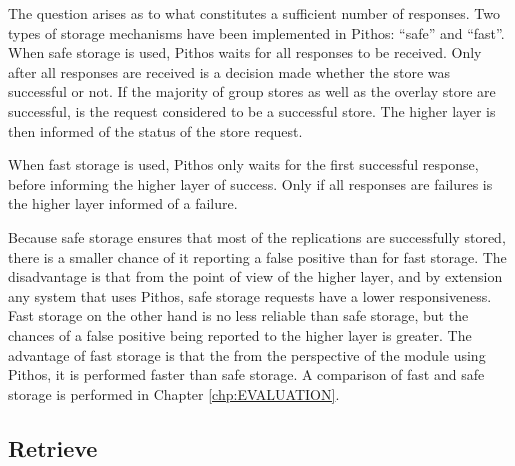 The question arises as to what constitutes a sufficient number of responses. Two types of storage mechanisms have been implemented in Pithos: ``safe'' and ``fast''. When safe storage is used, Pithos waits for all responses to be received. Only after all responses are received is a decision made whether the store was successful or not. If the majority of group stores as well as the overlay store are successful, is the request considered to be a successful store. The higher layer is then informed of the status of the store request.

When fast storage is used, Pithos only waits for the first successful response, before informing the higher layer of success. Only if all responses are failures is the higher layer informed of a failure.

Because safe storage ensures that most of the replications are successfully stored, there is a smaller chance of it reporting a false positive than for fast storage. The disadvantage is that from the point of view of the higher layer, and by extension any system that uses Pithos, safe storage requests have a lower responsiveness. Fast storage on the other hand is no less reliable than safe storage, but the chances of a false positive being reported to the higher layer is greater. The advantage of fast storage is that the from the perspective of the module using Pithos, it is performed faster than safe storage. A comparison of fast and safe storage is performed in Chapter \ref{chp:EVALUATION}.

\subsection{Retrieve}
\label{pithos_retrieve}


